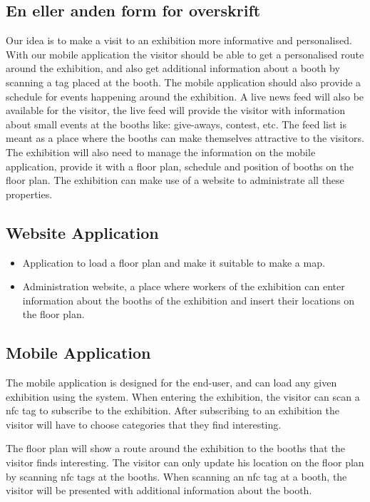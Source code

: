 \subsection*{En eller anden form for overskrift}

Our idea is to make a visit to an exhibition more informative and personalised.  With our mobile application the visitor should be able to get a personalised  route around the exhibition, and also get additional information about a booth by scanning a tag placed at the booth. The mobile application should also provide a schedule for events happening around the exhibition. A live news feed will also be available for the visitor, the live feed will provide the visitor with information about small events at the booths like: give-aways, contest, etc. The feed list is meant as a place where the booths can make themselves attractive to the visitors. The exhibition will also need to manage the information on the mobile application, provide it with a floor plan, schedule and position of booths on the floor plan. The exhibition can make use of a website to administrate all these properties.

\subsection*{Website Application}
\begin{itemize}
\item Application to load a floor plan and make it suitable to make a map.
\item Administration website, a place where workers of the exhibition can enter information about the booths of the exhibition and insert their locations on the floor plan.
\end{itemize}
\subsection*{Mobile Application}

The mobile application is designed for the end-user, and can load any given exhibition using the system. When entering the exhibition, the visitor can scan a \ac{nfc} tag to subscribe to the exhibition. After subscribing to an exhibition the visitor will have to choose categories that they find interesting. 

The floor plan will show a route around the exhibition to the booths that the visitor finds interesting. The visitor can only update his location on the floor plan by scanning \ac{nfc} tags at the booths. When scanning an \ac{nfc} tag at a booth, the visitor will be presented with additional information about the booth. 

